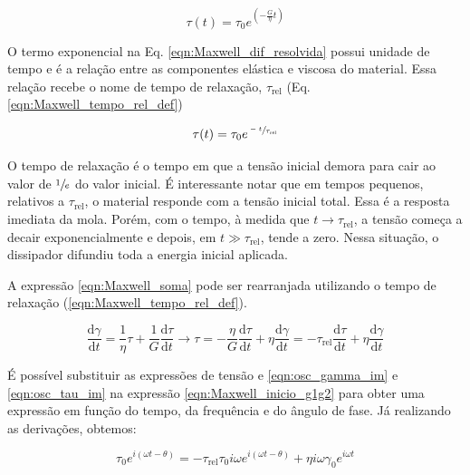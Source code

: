			\begin{equation}
				\tau(t) = \tau_0 e^{\left( -\frac{G}{\eta}t \right)}
				\label{eqn:Maxwell_dif_resolvida}
			\end{equation}
			
			O termo exponencial na Eq. \ref{eqn:Maxwell_dif_resolvida} possui unidade de tempo e é a relação entre as componentes elástica e viscosa do material. Essa relação recebe o nome de tempo de relaxação, \(\tau_{\textrm{rel}}\) (Eq. \ref{eqn:Maxwell_tempo_rel_def})
			
			\begin{equation}
				\tau(t) = \tau_0 e^{\sfrac{-t}{\tau_{\textrm{rel}}}}
				\label{eqn:Maxwell_tempo_rel_def}
			\end{equation}
		
			O tempo de relaxação é o tempo em que a tensão inicial demora para cair ao valor de \(\sfrac{1}{e}\) do valor inicial. É interessante notar que em tempos pequenos, relativos a \(\tau_{\textrm{rel}}\), o material responde com a tensão inicial total. Essa é a resposta imediata da mola. Porém, com o tempo, à medida que \(t\to\tau_{\textrm{rel}}\), a tensão começa a decair exponencialmente e depois, em \(t \gg \tau_{\textrm{rel}}\), tende a zero. Nessa situação, o dissipador difundiu toda a energia inicial aplicada.
			
			A expressão \ref{eqn:Maxwell_soma} pode ser rearranjada utilizando o tempo de relaxação (\ref{eqn:Maxwell_tempo_rel_def}).
			
			\begin{equation}
				\dfrac{\mathrm{d}\gamma}{\mathrm{d}t} = \dfrac{1}{\eta}\tau + \dfrac{1}{G}\dfrac{\mathrm{d}\tau}{\mathrm{d}t} \to 
				\tau = -\dfrac{\eta}{G} \dfrac{\mathrm{d}\tau}{\mathrm{d}t} + \eta\dfrac{\mathrm{d}\gamma}{\mathrm{d}t} =
				-\tau_{\textrm{rel}} \dfrac{\mathrm{d}\tau}{\mathrm{d}t} + \eta\dfrac{\mathrm{d}\gamma}{\mathrm{d}t}
				\label{eqn:Maxwell_inicio_g1g2}
			\end{equation}
			
			É possível substituir as expressões de tensão e \ref{eqn:osc_gamma_im} e \ref{eqn:osc_tau_im} na expressão \ref{eqn:Maxwell_inicio_g1g2} para obter uma expressão em função do tempo, da frequência e do ângulo de fase. Já realizando as derivações, obtemos:
			
			\begin{equation}
				\tau_0 e^{i \left( \omega t - \theta \right)} = - \tau_{\textrm{rel}} \tau_0 i\omega e^{i \left( \omega t - \theta \right)}     +       \eta i\omega\gamma_0e^{i\omega t}
				\label{eqn:Maxwell_substituicao}
			\end{equation}
			

